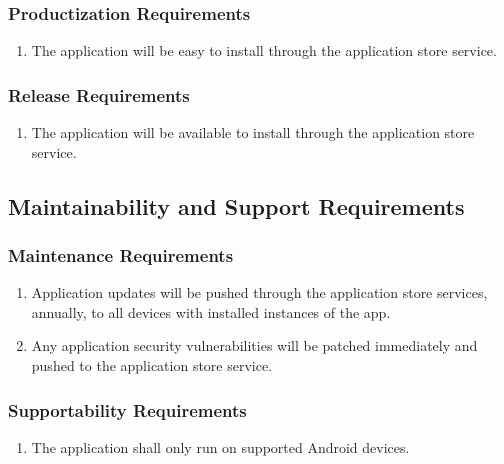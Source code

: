 \documentclass[titlepage]{article}
\newcounter{myCounter}
\begin{document}
\subsubsection{Productization Requirements}
\label{ssub:productization_requirements}
\begin{enumerate}[{OE}1. ]
    \setcounter{enumi}{\themyCounter}
	\item The application will be easy to install through the application store service.
    \setcounter{myCounter}{\theenumi}
\end{enumerate}

\subsubsection{Release Requirements}
\label{ssub:release_requirements}
\begin{enumerate}[{OE}1. ]
    \setcounter{enumi}{\themyCounter}
	\item The application will be available to install through the application store service.
    \setcounter{myCounter}{\theenumi}
\end{enumerate}


\subsection{Maintainability and Support Requirements}
\label{sub:maintainability_and_support_requirements}
\setcounter{myCounter}{0}

\subsubsection{Maintenance Requirements}
\label{ssub:maintenance_requirements}
\begin{enumerate}[{MS}1. ]
    \setcounter{enumi}{\themyCounter}
    \item Application updates will be pushed through the application store services, annually, to
    all devices with installed instances of the app.
    \item Any application security vulnerabilities will be patched immediately and pushed to the
    application store service.
    \setcounter{myCounter}{\theenumi}
\end{enumerate}

\subsubsection{Supportability Requirements}
\label{ssub:supportability_requirements}
\begin{enumerate}[{MS}1. ]
    \setcounter{enumi}{\themyCounter}
	\item The application shall only run on supported Android devices.
    \setcounter{myCounter}{\theenumi}
\end{enumerate}
\end{document}
